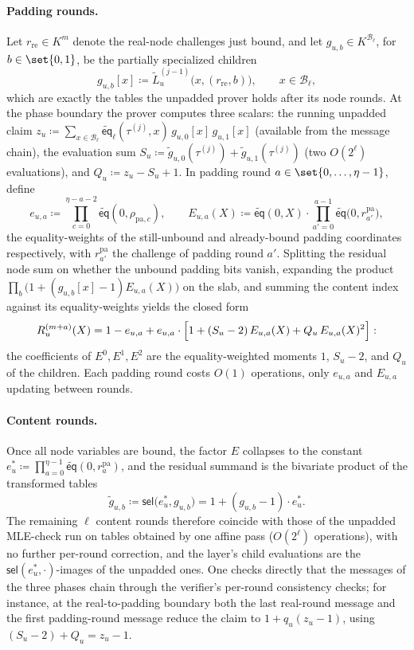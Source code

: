 \documentclass{article}
\theoremstyle{definition}
\newcommand*{\mle}{\widetilde}
\newcommand{\eq}{\mathsf{eq}}
\newcommand{\BB}{\mathcal{B}}
\newcommand{\sel}{\textsf{sel}}
\begin{document}
\paragraph{Padding rounds.}
Let $r_\text{re} \in K^m$ denote the real-node challenges just bound, and let $g_{u, b} \in K^{\BB_\ell}$, for $b \in \set{0, 1}$, be the partially specialized children
\[
  g_{u, b}[x] \coloneqq \mle{L}^{(j - 1)}_u\bigl( x, (r_\text{re}, b) \bigr), \qquad x \in \BB_\ell,
\]
which are exactly the tables the unpadded prover holds after its node rounds. At the phase boundary the prover computes three scalars: the running unpadded claim $z_u \coloneqq \sum_{x \in \BB_\ell} \mle{\eq}_\ell(\tau^{(j)}, x) \, g_{u, 0}[x] \, g_{u, 1}[x]$ (available from the message chain), the evaluation sum $S_u \coloneqq \mle{g}_{u, 0}(\tau^{(j)}) + \mle{g}_{u, 1}(\tau^{(j)})$ (two $O(2^\ell)$ evaluations), and $Q_u \coloneqq z_u - S_u + 1$. In padding round $a \in \set{0, \ldots, \eta - 1}$, define
\[
  e_{u, a} \coloneqq \prod_{c = 0}^{\eta - a - 2} \mle{\eq}(0, \rho_{\text{pa}, c}), \qquad E_{u, a}(X) \coloneqq \mle{\eq}(0, X) \cdot \prod_{a' = 0}^{a - 1} \mle{\eq}\bigl( 0, r^\text{pa}_{a'} \bigr),
\]
the equality-weights of the still-unbound and already-bound padding coordinates respectively, with $r^\text{pa}_{a'}$ the challenge of padding round $a'$. Splitting the residual node sum on whether the unbound padding bits vanish, expanding the product $\prod_b \bigl( 1 + (g_{u, b}[x] - 1) E_{u, a}(X) \bigr)$ on the slab, and summing the content index against its equality-weights yields the closed form
\[
  R^{(m + a)}_u(X) = 1 - e_{u, a} + e_{u, a} \cdot \Bigl[ 1 + (S_u - 2) \, E_{u, a}(X) + Q_u \, E_{u, a}(X)^2 \Bigr]:
\]
the coefficients of $E^0, E^1, E^2$ are the equality-weighted moments $1$, $S_u - 2$, and $Q_u$ of the children. Each padding round costs $O(1)$ operations, only $e_{u, a}$ and $E_{u, a}$ updating between rounds.

\paragraph{Content rounds.}
Once all node variables are bound, the factor $E$ collapses to the constant $e^*_u \coloneqq \prod_{a = 0}^{\eta - 1} \mle{\eq}(0, r^\text{pa}_a)$, and the residual summand is the bivariate product of the transformed tables
\[
  \tilde{g}_{u, b} \coloneqq \sel\bigl( e^*_u, g_{u, b} \bigr) = 1 + (g_{u, b} - 1) \cdot e^*_u.
\]
The remaining $\ell$ content rounds therefore coincide with those of the unpadded MLE-check run on tables obtained by one affine pass ($O(2^\ell)$ operations), with no further per-round correction, and the layer's child evaluations are the $\sel(e^*_u, \cdot)$-images of the unpadded ones. One checks directly that the messages of the three phases chain through the verifier's per-round consistency checks; for instance, at the real-to-padding boundary both the last real-round message and the first padding-round message reduce the claim to $1 + q_u (z_u - 1)$, using $(S_u - 2) + Q_u = z_u - 1$.
\end{document}
